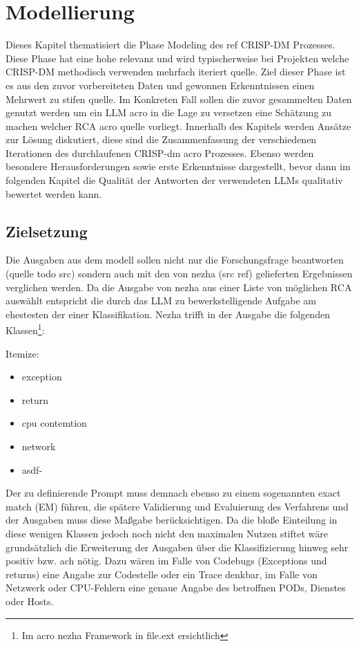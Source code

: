 \chapter{Modellierung}
\label{cha:Modellierung}

Dieses Kapitel thematisiert die Phase Modeling des ref CRISP-DM Prozesses. Diese Phase hat eine hohe relevanz und wird typischerweise bei Projekten welche CRISP-DM methodisch verwenden mehrfach iteriert quelle. Ziel dieser Phase ist es aus den zuvor vorbereiteten Daten und gewonnen Erkenntnissen einen Mehrwert zu stifen quelle. Im Konkreten Fall sollen die zuvor gesammelten Daten genutzt werden um ein LLM acro in die Lage zu versetzen eine Schätzung zu machen welcher RCA acro quelle vorliegt. Innerhalb des Kapitels werden Ansätze zur Lösung diskutiert, diese sind die Zusammenfassung der verschiedenen Iterationen des durchlaufenen CRISP-dm acro Prozesses. Ebenso werden besondere Herausforderungen sowie erste Erkenntnisse dargestellt, bevor dann im folgenden Kapitel die Qualität der Antworten der verwendeten LLMs qualitativ bewertet werden kann. 

\section{Zielsetzung}
\label{sec:Zielsetzung}

Die Ausgaben aus dem modell sollen nicht nur die Forschungsfrage beantworten (quelle todo src) sondern auch mit den von nezha (src ref) gelieferten Ergebnissen verglichen werden. Da die Ausgabe von nezha aus einer Liste von möglichen RCA auswählt entspricht die durch das LLM zu bewerkstelligende Aufgabe am ehestesten der einer Klassifikation. Nezha trifft in der Ausgabe die folgenden Klassen\footnote{Im acro nezha Framework in file.ext ersichtlich}:

Itemize:
\begin{itemize}
\item exception
\item return
\item cpu contemtion
\item network
\item asdf-
\end{itemize}

Der zu definierende Prompt muss demnach ebenso zu einem sogenannten exact match (EM) führen, die spätere Validierung und Evaluierung des Verfahrens und der Ausgaben muss diese Maßgabe berücksichtigen. Da die bloße Einteilung in diese wenigen Klassen jedoch noch nicht den maximalen Nutzen stiftet wäre grundsätzlich die Erweiterung der Ausgaben über die Klassifizierung hinweg sehr positiv bzw. ach nötig. Dazu wären im Falle von Codebugs (Exceptions und returns) eine Angabe zur Codestelle oder ein Trace denkbar, im Falle von Netzwerk oder CPU-Fehlern eine genaue Angabe des betroffnen PODs, Dienstes oder Hosts.

